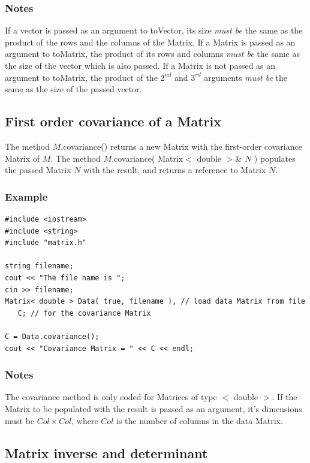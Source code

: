 \documentclass{report}
\begin{document}
\subsubsection{Notes}
If a vector is passed as an argument to toVector, its size {\em must
be} the same as the product of the rows and the columns of the Matrix.
If a Matrix is passed as an argument to toMatrix, the product of its
rows and columns {\em must be} the same as the size of the vector
which is also passed.  If a Matrix is not passed as an argument to
toMatrix, the product of the $2^{nd}$ and $3^{rd}$ arguments {\em must
be} the same as the size of the passed vector.

\subsection{First order covariance of a Matrix}

The method $M$.covariance() returns a new Matrix with the first-order
covariance Matrix of $M$.  The method $M$.covariance( Matrix$<$ double
$>$\& $N$ ) populates the passed Matrix $N$ with the result, and
returns a reference to Matrix $N$.

\subsubsection{Example}
\begin{verbatim}
#include <iostream>
#include <string>
#include "matrix.h"

string filename;
cout << "The file name is ";
cin >> filename;
Matrix< double > Data( true, filename ), // load data Matrix from file
   C; // for the covariance Matrix

C = Data.covariance();
cout << "Covariance Matrix = " << C << endl;
\end{verbatim}

\subsubsection{Notes}

The covariance method is only coded for Matrices of type $<$ double
$>$.  If the Matrix to be populated with the result is passed as an
argument, it's dimensions must be $Col \times Col$, where $Col$ is the
number of columns in the data Matrix.

\subsection{Matrix inverse and determinant}
\end{document}
